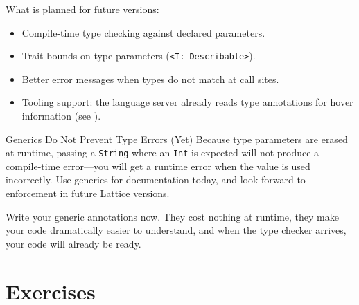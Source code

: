 What is planned for future versions:
\begin{itemize}
  \item Compile-time type checking against declared parameters.
  \item Trait bounds on type parameters (\lstinline|<T: Describable>|).
  \item Better error messages when types do not match at call sites.
  \item Tooling support: the language server already reads type annotations
    for hover information (see ).
\end{itemize}

\begin{warnbox}{Generics Do Not Prevent Type Errors (Yet)}
Because type parameters are erased at runtime, passing a
\lstinline|String| where an \lstinline|Int| is expected will not produce
a compile-time error---you will get a runtime error when the value is used
incorrectly. Use generics for documentation today, and look forward to
enforcement in future Lattice versions.
\end{warnbox}

Write your generic annotations now. They cost nothing at runtime, they make
your code dramatically easier to understand, and when the type checker
arrives, your code will already be ready.

\section{Exercises}\label{sec:generics-exercises}

